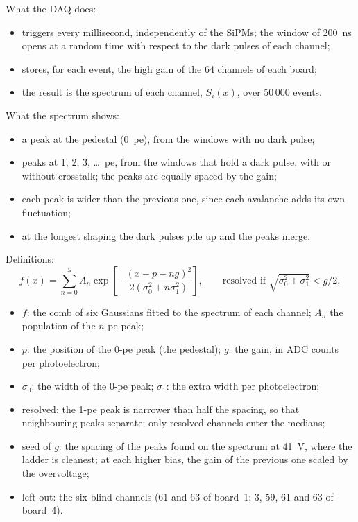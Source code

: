 \documentclass[11pt,a4paper]{article}
\begin{document}
What the DAQ does:
\begin{itemize}
\item triggers every millisecond, independently of the SiPMs; the window of 200~ns opens at
  a random time with respect to the dark pulses of each channel;
\item stores, for each event, the high gain of the 64 channels of each board;
\item the result is the spectrum of each channel, $S_i(x)$, over 50\,000 events.
\end{itemize}
What the spectrum shows:
\begin{itemize}
\item a peak at the pedestal (0~pe), from the windows with no dark pulse;
\item peaks at 1, 2, 3, \ldots~pe, from the windows that hold a dark pulse, with or without
  crosstalk; the peaks are equally spaced by the gain;
\item each peak is wider than the previous one, since each avalanche adds its own fluctuation;
\item at the longest shaping the dark pulses pile up and the peaks merge.
\end{itemize}
Definitions:
\begin{equation*}
f(x) = \sum_{n=0}^{5} A_n \exp\left[-\frac{(x - p - n g)^2}{2(\sigma_0^2 + n\sigma_1^2)}\right],
\qquad \text{resolved if } \sqrt{\sigma_0^2 + \sigma_1^2} < g/2,
\end{equation*}
\begin{itemize}
\item $f$: the comb of six Gaussians fitted to the spectrum of each channel; $A_n$ the
  population of the $n$-pe peak;
\item $p$: the position of the 0-pe peak (the pedestal); $g$: the gain, in ADC counts per
  photoelectron;
\item $\sigma_0$: the width of the 0-pe peak; $\sigma_1$: the extra width per photoelectron;
\item resolved: the 1-pe peak is narrower than half the spacing, so that neighbouring peaks
  separate; only resolved channels enter the medians;
\item seed of $g$: the spacing of the peaks found on the spectrum at 41~V, where the ladder is
  cleanest; at each higher bias, the gain of the previous one scaled by the overvoltage;
\item left out: the six blind channels (61 and 63 of board~1; 3, 59, 61 and 63 of board~4).
\end{itemize}
\end{document}
